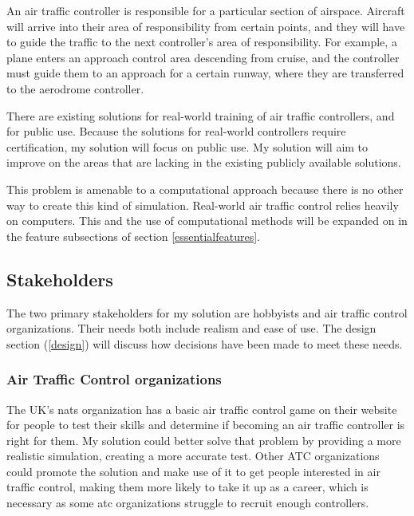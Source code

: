 \documentclass{article}
\begin{document}
An air traffic controller is responsible for a particular section of \gls{airspace}.
Aircraft will arrive into their area of responsibility from certain points, and they will have to guide the traffic to the next controller's area of responsibility.
For example, a plane enters an approach control area descending from cruise, and the controller must guide them to an approach for a certain runway, where they are transferred to the aerodrome controller.

There are existing solutions for real-world training of air traffic controllers, and for public use.
Because the solutions for real-world controllers require certification, my solution will focus on public use.
My solution will aim to improve on the areas that are lacking in the existing publicly available solutions.

This problem is amenable to a computational approach because there is no other way to create this kind of simulation.
Real-world air traffic control relies heavily on computers.
This and the use of computational methods will be expanded on in the feature subsections of section \ref{essentialfeatures}.

\subsection{Stakeholders}
The two primary stakeholders for my solution are hobbyists and air traffic control organizations.
Their needs both include realism and ease of use.
The design section (\ref{design}) will discuss how decisions have been made to meet these needs.

\subsubsection{Air Traffic Control organizations}
The UK's \acrfull{nats} organization has a basic air traffic control game on their website for people to test their skills and determine if becoming an air traffic controller is right for them.
My solution could better solve that problem by providing a more realistic simulation, creating a more accurate test.
Other ATC organizations could promote the solution and make use of it to get people interested in air traffic control, making them more likely to take it up as a career, which is necessary as some \acrshort{atc} organizations struggle to recruit enough controllers\cite{indiaatcshortage}.
\end{document}
